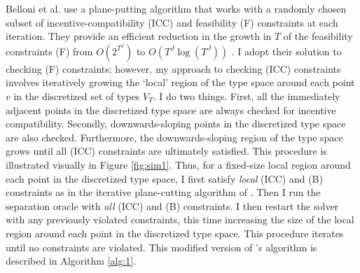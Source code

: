 Belloni et al. \autocite*{belloni2010multidimensional} use a plane-putting algorithm that works with a randomly chosen subset of incentive-compatibility (ICC) and feasibility (F) constraints at each iteration. They provide an efficient reduction in the growth in $T$ of the feasibility constraints (F) from $O(2^{T^J})$ to $O(T^J \log(T^J))$ \autocite[Lemma 10]{belloni2010multidimensional}. I adopt their solution to checking (F) constraints; however, my approach to checking (ICC) constraints involves iteratively growing the `local' region of the type space around each point $v$ in the discretized set of types $V_T$. I do two things. First, all the immediately adjacent points in the discretized type space are always checked for incentive compatibility. Secondly, downwards-sloping points in the discretized type space are also checked. Furthermore, the downwards-sloping region of the type space grows until all (ICC) constraints are ultimately satisfied. This procedure is illustrated visually in Figure \ref{fig:sim1}. Thus, for a fixed-size local region around each point in the discretized type space, I first satisfy \textit{local} (ICC) and (B) constraints as in the iterative plane-cutting algorithm of \autocite{belloni2010multidimensional}. Then I run the separation oracle with \textit{all} (ICC) and (B) constraints. I then restart the solver with any previously violated constraints, this time increasing the size of the local region around each point in the discretized type space. This procedure iterates until no constraints are violated. This modified version of \autocite{belloni2010multidimensional}'s algorithm is described in Algorithm \ref{alg:1}.


